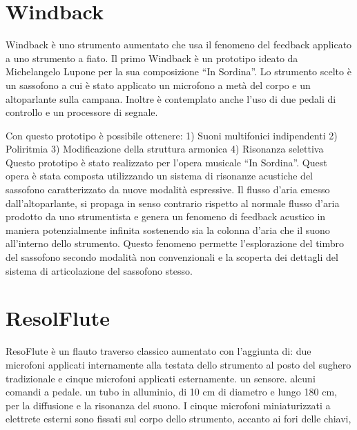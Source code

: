 \section{Windback}

Windback è uno strumento aumentato che usa il fenomeno del feedback applicato a uno strumento a fiato.
Il primo Windback è un prototipo ideato da Michelangelo Lupone per la sua composizione “In Sordina”. 
Lo strumento scelto è un sassofono a cui è stato applicato un microfono a metà del corpo e un altoparlante sulla campana.
Inoltre è contemplato anche l’uso di due pedali di controllo e un processore di segnale. 

Con questo prototipo è possibile ottenere:
1) Suoni multifonici indipendenti
2) Poliritmia
3) Modificazione della struttura armonica
4) Risonanza selettiva
Questo prototipo è stato realizzato per l’opera musicale “In Sordina”. 
Quest opera è stata composta utilizzando un sistema di risonanze acustiche del sassofono caratterizzato da nuove modalità espressive.
Il flusso d’aria emesso dall’altoparlante, si propaga in senso contrario rispetto al normale flusso d’aria prodotto da uno strumentista e genera un fenomeno di feedback acustico in maniera potenzialmente infinita sostenendo sia la colonna d’aria che il suono all’interno dello strumento.
Questo fenomeno permette l’esplorazione  del timbro del sassofono secondo modalità non convenzionali e la scoperta dei dettagli del sistema di articolazione del sassofono stesso.


\section{ResolFlute}

ResoFlute è un flauto traverso classico aumentato con l’aggiunta di:
due microfoni applicati internamente alla testata dello strumento al posto del sughero tradizionale e cinque microfoni applicati esternamente.
un sensore.
alcuni comandi a pedale. 
un tubo in alluminio, di 10 cm di diametro e lungo 180 cm, per la diffusione e la risonanza del suono.
I cinque microfoni miniaturizzati a elettrete esterni sono fissati sul corpo  dello strumento, accanto ai fori delle chiavi,

